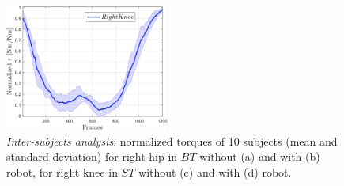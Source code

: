 \begin{figure}[!ht]
 \includegraphics[width=0.48\textwidth]{figs/torqueRightKneeSHR}
      \caption{\emph{Inter-subjects analysis}: normalized torques of 10 subjects
		  (mean and standard deviation) for right hip in $BT$ without (a) and with (b) 
		  robot, for right knee in $ST$ without (c) and with (d) robot.}
 \end{figure}
%
